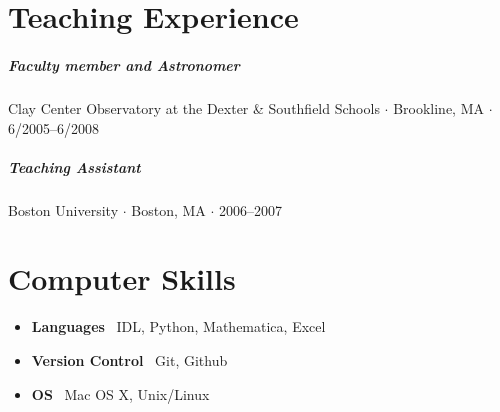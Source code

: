 \documentclass[10pt,letterpaper]{article}
\begin{document}
\section*{Teaching Experience}

\subparagraph{Faculty member and Astronomer}
Clay Center Observatory at the Dexter \& Southfield Schools  $\cdot$ Brookline, MA $\cdot$ 6/2005--6/2008

\subparagraph{Teaching Assistant} 
Boston University $\cdot$ Boston, MA $\cdot$ 2006--2007


\section*{Computer Skills}

\begin{itemize}
    \item \textbf{Languages} \ IDL, Python, Mathematica, Excel
    \item \textbf{Version Control} \ Git, Github
    \item \textbf{OS} \ Mac OS X, Unix/Linux
\end{itemize}
\end{document}
